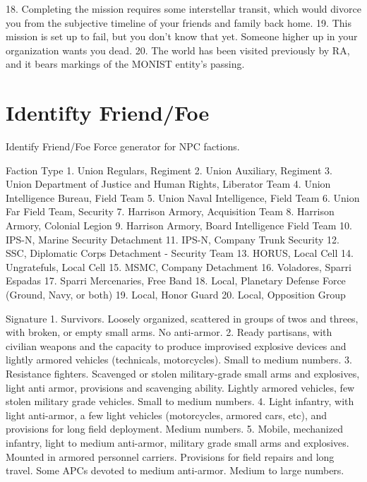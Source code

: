     18. Completing the mission requires some interstellar transit, which would divorce you from
        the subjective timeline of your friends and family back home.
    19. This mission is set up to fail, but you don’t know that yet. Someone higher up in your
        organization wants you dead.
    20. The world has been visited previously by RA, and it bears markings of the MONIST entity's
        passing.

\section{Identifty Friend/Foe}

Identify Friend/Foe
Force generator for NPC factions.

Faction Type
    1.  Union Regulars, Regiment
    2.  Union Auxiliary, Regiment
    3.  Union Department of Justice and Human Rights, Liberator Team
    4.  Union Intelligence Bureau, Field Team
    5.  Union Naval Intelligence, Field Team
    6.  Union Far Field Team, Security
    7.  Harrison Armory, Acquisition Team
    8.  Harrison Armory, Colonial Legion
    9.  Harrison Armory, Board Intelligence Field Team
    10. IPS-N, Marine Security Detachment
    11. IPS-N, Company Trunk Security
    12. SSC, Diplomatic Corps Detachment - Security Team
    13. HORUS, Local Cell
    14. Ungratefuls, Local Cell
    15. MSMC, Company Detachment
    16. Voladores, Sparri Espadas
    17. Sparri Mercenaries, Free Band
    18. Local, Planetary Defense Force (Ground, Navy, or both)
    19. Local, Honor Guard
    20. Local, Opposition Group

Signature
    1.  Survivors. Loosely organized, scattered in groups of twos and threes, with broken, or
        empty small arms. No anti-armor.
    2.  Ready partisans, with civilian weapons and the capacity to produce improvised explosive
        devices and lightly armored vehicles (technicals, motorcycles). Small to medium numbers.
    3.  Resistance fighters. Scavenged or stolen military-grade small arms and explosives, light
        anti armor, provisions and scavenging ability. Lightly armored vehicles, few stolen military
        grade vehicles. Small to medium numbers.
    4.  Light infantry, with light anti-armor, a few light vehicles (motorcycles, armored cars, etc),
        and provisions for long field deployment. Medium numbers.
    5.  Mobile, mechanized infantry, light to medium anti-armor, military grade small arms and
        explosives. Mounted in armored personnel carriers. Provisions for field repairs and long
        travel. Some APCs devoted to medium anti-armor. Medium to large numbers.





